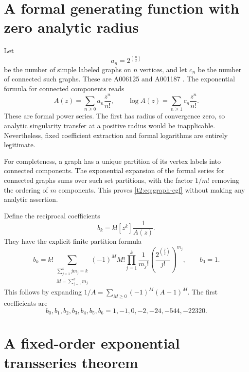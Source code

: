 \documentclass[11pt,openany]{book}
\numberwithin{equation}{chapter}
\theoremstyle{plain}
\theoremstyle{definition}
\theoremstyle{remark}
\begin{document}
\section{A formal generating function with zero analytic radius}

Let
\[
 a_n=2^{\binom n2}
\]
be the number of simple labeled graphs on $n$ vertices, and let $c_n$ be the number of connected such graphs. These are A006125 and A001187 \cite{oeisallgraphs,oeisconnected}. The exponential formula for connected components reads
\begin{equation}
 A(z)=\sum_{n\ge0}a_n\frac{z^n}{n!},\qquad
 \log A(z)=\sum_{n\ge1}c_n\frac{z^n}{n!}.
 \label{t2:eq:graph-egf}
\end{equation}
These are formal power series. The first has radius of convergence zero, so analytic singularity transfer at a positive radius would be inapplicable. Nevertheless, fixed coefficient extraction and formal logarithms are entirely legitimate.

For completeness, a graph has a unique partition of its vertex labels into connected components. The exponential expansion of the formal series for connected graphs sums over such set partitions, with the factor $1/m!$ removing the ordering of $m$ components. This proves \eqref{t2:eq:graph-egf} without making any analytic assertion.

Define the reciprocal coefficients
\begin{equation}
 b_k=k![z^k]\frac1{A(z)}.
 \label{t2:eq:graph-b}
\end{equation}
They have the explicit finite partition formula
\begin{equation}
 b_k=k!\sum_{\substack{\sum_{j=1}^k jm_j=k\\M=\sum_{j=1}^k m_j}}
       (-1)^M M!\prod_{j=1}^k
            \frac1{m_j!}\left(\frac{2^{\binom j2}}{j!}\right)^{m_j},
 \qquad b_0=1.
 \label{t2:eq:graph-b-finite}
\end{equation}
This follows by expanding $1/A=\sum_{M\ge0}(-1)^M(A-1)^M$. The first coefficients are
\begin{equation}
 b_0,b_1,b_2,b_3,b_4,b_5,b_6
   =1,-1,0,-2,-24,-544,-22320.
 \label{t2:eq:graph-b-first}
\end{equation}

\section{A fixed-order exponential transseries theorem}
\end{document}
